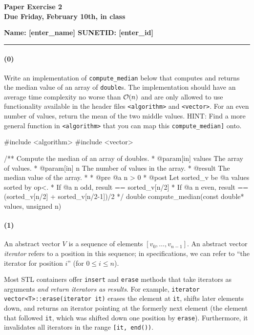 \documentclass[12pt,letterpaper,twoside]{article}
\begin{document}
{\centering \textbf{Paper Exercise 2\\ Due Friday, February 10th, in class \\}}
{\centering \textbf{Name: [enter\_name] SUNETID: [enter\_id]} \par}
\vspace*{-8pt}\noindent\rule{\linewidth}{1pt}

\paragraph{(0)} Write an implementation of {\tt compute\_median} below that computes and returns the median value of an array of {\tt double}s. The implementation should have an average time complexity no worse than $\mathcal{O}(n)$ and are only allowed to use functionality available in the header files {\tt <algorithm>} and {\tt <vector>}. For an even number of values, return the mean of the two middle values. HINT: Find a more general function in {\tt <algorithm>} that you can map this {\tt compute\_median]} onto.
\begin{cpp}
#include <algorithm>
#include <vector>

/** Compute the median of an array of doubles.
 * @param[in] values  The array of values.
 * @param[in]      n  The number of values in the array.
 * @result The median value of the array.
 *
 * @pre @a n > 0
 * @post Let sorted_v be @a values sorted by op<.
 *         If @a n odd,  result ==  sorted_v[n/2]
 *         If @a n even, result == (sorted_v[n/2] + sorted_v[n/2-1])/2
 */
double compute_median(const double* values, unsigned n)
\end{cpp}

\paragraph{(1)} An abstract vector $V$ is a sequence of elements $[v_0,
\dots, v_{n-1}]$. An abstract vector \emph{iterator} refers to a position
in this sequence; in specifications, we can refer to ``the iterator for position
$i$'' (for $0\leq i\leq n$).

Most STL containers offer \texttt{insert} and \texttt{erase} methods that take iterators as arguments \emph{and return iterators as results}. For example, \texttt{iterator vector<T>::erase(iterator it)} erases the element at \texttt{it}, shifts later elements down, and returns an iterator pointing at the formerly next element (the element that followed \texttt{it}, which was shifted down one position by \texttt{erase}). Furthermore, it invalidates all iterators in the range \texttt{[it, end())}.
\end{document}
